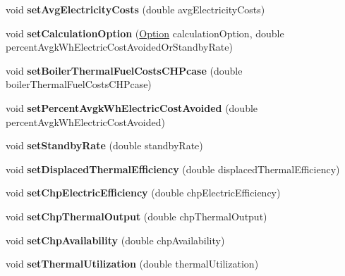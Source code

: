 \begin{DoxyCompactItemize}
\mbox{\label{class_c_h_p_ad953f7558bf3a38816e29d9ffaf6273c}} 
void {\bfseries set\+Avg\+Electricity\+Costs} (double avg\+Electricity\+Costs)
\item 
\mbox{\label{class_c_h_p_abfa71c23fa4b58c03c3337b57ba0d56d}} 
void {\bfseries set\+Calculation\+Option} (\hyperlink{class_c_h_p_ac82f530412021ace928a7e95c1295d06}{Option} calculation\+Option, double percent\+Avgk\+Wh\+Electric\+Cost\+Avoided\+Or\+Standby\+Rate)
\item 
\mbox{\label{class_c_h_p_a319f1e915035b2dface2dbad67c65017}} 
void {\bfseries set\+Boiler\+Thermal\+Fuel\+Costs\+C\+H\+Pcase} (double boiler\+Thermal\+Fuel\+Costs\+C\+H\+Pcase)
\item 
\mbox{\label{class_c_h_p_a002b9e405c3a1777b306430cd1bbbec3}} 
void {\bfseries set\+Percent\+Avgk\+Wh\+Electric\+Cost\+Avoided} (double percent\+Avgk\+Wh\+Electric\+Cost\+Avoided)
\item 
\mbox{\label{class_c_h_p_ac25d489d5d3e336f7286c0124f81d3c5}} 
void {\bfseries set\+Standby\+Rate} (double standby\+Rate)
\item 
\mbox{\label{class_c_h_p_a6f80ede27800dfdeb0493e0501823fde}} 
void {\bfseries set\+Displaced\+Thermal\+Efficiency} (double displaced\+Thermal\+Efficiency)
\item 
\mbox{\label{class_c_h_p_a63de982e8324e669ea8a6712a30a6ce4}} 
void {\bfseries set\+Chp\+Electric\+Efficiency} (double chp\+Electric\+Efficiency)
\item 
\mbox{\label{class_c_h_p_a4b132e4e600df80fa87c0e7b680733b7}} 
void {\bfseries set\+Chp\+Thermal\+Output} (double chp\+Thermal\+Output)
\item 
\mbox{\label{class_c_h_p_a0dc3c1f0e0b67564a56b5863c1abf974}} 
void {\bfseries set\+Chp\+Availability} (double chp\+Availability)
\item 
\mbox{\label{class_c_h_p_a8917dfa8b8a68244d0ffe3fd3ca1d13f}} 
void {\bfseries set\+Thermal\+Utilization} (double thermal\+Utilization)
\item 

\end{DoxyCompactItemize}
